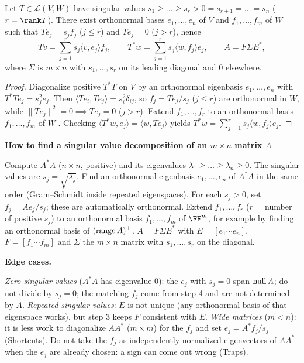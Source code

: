 \documentclass[10pt]{scrartcl}
\newcommand{\LL}{\mathcal L}\newcommand{\PP}{\mathcal P}\newcommand{\MM}{\mathcal M}
\newenvironment{methodbox}[1]{\begin{mdframed}[style=mdbluebox,linecolor=NavyBlue,backgroundcolor=NavyBlue!3]\textbf{\color{NavyBlue}#1}\par\vspace{2pt}}{\end{mdframed}}
\begin{document}
\begin{proposition*}[Rectangular SVD between two spaces, $T\in\LL(V,W)$]
  Let $T\in\LL(V,W)$ have singular values $s_1\ge\dots\ge s_r>0=s_{r+1}=\dots=s_n$ ($r=\rank T$). There exist orthonormal bases $e_1,\dots,e_n$ of $V$ and $f_1,\dots,f_m$ of $W$ such that $Te_j=s_j f_j$ ($j\le r$) and $Te_j=0$ ($j>r$), hence
  \[
    Tv = \sum_{j=1}^r s_j\langle v,e_j\rangle f_j, \qquad
    T^*w = \sum_{j=1}^r s_j\langle w,f_j\rangle e_j, \qquad
    A = F\Sigma E^*,
  \]
  where $\Sigma$ is $m\times n$ with $s_1,\dots,s_r$ on its leading diagonal and $0$ elsewhere.
\end{proposition*}
\begin{proof}
  Diagonalize positive $T^*T$ on $V$ by an orthonormal eigenbasis $e_1,\dots,e_n$ with $T^*Te_j=s_j^2 e_j$. Then $\langle Te_i,Te_j\rangle=s_i^2\delta_{ij}$, so $f_j=Te_j/s_j$ ($j\le r$) are orthonormal in $W$, while $\|Te_j\|^2=0\implies Te_j=0$ ($j>r$). Extend $f_1,\dots,f_r$ to an orthonormal basis $f_1,\dots,f_m$ of $W$ . Checking $\langle T^*w,e_j\rangle=\langle w,Te_j\rangle$ yields $T^*w=\sum_{j=1}^r s_j\langle w,f_j\rangle e_j$.
\end{proof}

\begin{methodbox}{How to find a singular value decomposition of an $m\times n$ matrix $A$}
\begin{enumerate}[label=\arabic*.,leftmargin=1.5em,itemsep=2pt,topsep=2pt]
  \ii Compute $A^*A$ ($n\times n$, positive) and its eigenvalues $\lambda_1\ge\dots\ge\lambda_n\ge0$. The singular values are $s_j=\sqrt{\lambda_j}$.
  \ii Find an orthonormal eigenbasis $e_1,\dots,e_n$ of $A^*A$ in the same order (Gram--Schmidt inside repeated eigenspaces).
  \ii For each $s_j>0$, set $f_j=Ae_j/s_j$; these are automatically orthonormal.
  \ii Extend $f_1,\dots,f_r$ ($r$ = number of positive $s_j$) to an orthonormal basis $f_1,\dots,f_m$ of $\FF^m$, for example by finding an orthonormal basis of $(\operatorname{range} A)^\perp$.
  \ii $A=F\Sigma E^*$ with $E=[e_1\cdots e_n]$, $F=[f_1\cdots f_m]$ and $\Sigma$ the $m\times n$ matrix with $s_1,\dots,s_r$ on the diagonal.
\end{enumerate}
\textbf{Edge cases.}
\begin{itemize}
  \ii \emph{Zero singular values} ($A^*A$ has eigenvalue $0$): the $e_j$ with $s_j=0$ span $\operatorname{null} A$; do not divide by $s_j=0$; the matching $f_j$ come from step 4 and are not determined by $A$.
  \ii \emph{Repeated singular values}: $E$ is not unique (any orthonormal basis of that eigenspace works), but step 3 keeps $F$ consistent with $E$.
  \ii \emph{Wide matrices} ($m<n$): it is less work to diagonalize $AA^*$ ($m\times m$) for the $f_j$ and set $e_j=A^*f_j/s_j$ (Shortcuts).
  \ii Do not take the $f_j$ as independently normalized eigenvectors of $AA^*$ when the $e_j$ are already chosen: a sign can come out wrong (Traps).
\end{itemize}
\end{methodbox}
\end{document}
